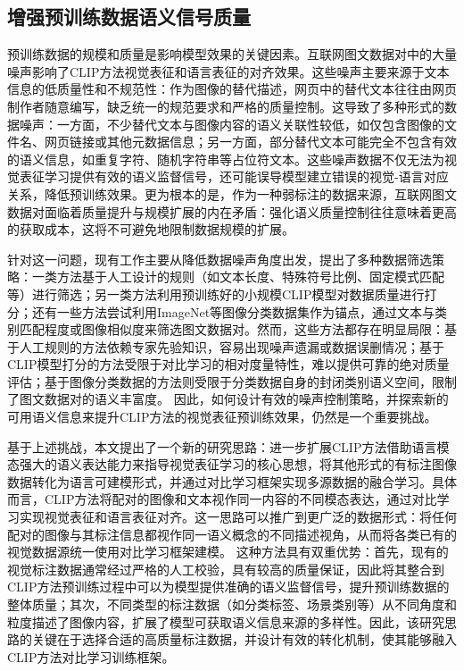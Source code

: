 \subsection{增强预训练数据语义信号质量}
预训练数据的规模和质量是影响模型效果的关键因素。互联网图文数据对中的大量噪声影响了CLIP方法视觉表征和语言表征的对齐效果。这些噪声主要来源于文本信息的低质量性和不规范性：作为图像的替代描述，网页中的替代文本往往由网页制作者随意编写，缺乏统一的规范要求和严格的质量控制。这导致了多种形式的数据噪声：一方面，不少替代文本与图像内容的语义关联性较低，如仅包含图像的文件名、网页链接或其他元数据信息；另一方面，部分替代文本可能完全不包含有效的语义信息，如重复字符、随机字符串等占位符文本。这些噪声数据不仅无法为视觉表征学习提供有效的语义监督信号，还可能误导模型建立错误的视觉-语言对应关系，降低预训练效果。更为根本的是，作为一种弱标注的数据来源，互联网图文数据对面临着质量提升与规模扩展的内在矛盾：强化语义质量控制往往意味着更高的获取成本，这将不可避免地限制数据规模的扩展。

针对这一问题，现有工作主要从降低数据噪声角度出发，提出了多种数据筛选策略：一类方法基于人工设计的规则（如文本长度、特殊符号比例、固定模式匹配等）进行筛选；另一类方法利用预训练好的小规模CLIP模型对数据质量进行打分；还有一些方法尝试利用ImageNet等图像分类数据集作为锚点，通过文本与类别匹配程度或图像相似度来筛选图文数据对。然而，这些方法都存在明显局限：基于人工规则的方法依赖专家先验知识，容易出现噪声遗漏或数据误删情况；基于CLIP模型打分的方法受限于对比学习的相对度量特性，难以提供可靠的绝对质量评估；基于图像分类数据的方法则受限于分类数据自身的封闭类别语义空间，限制了图文数据对的语义丰富度。
因此，如何设计有效的噪声控制策略，并探索新的可用语义信息来提升CLIP方法的视觉表征预训练效果，仍然是一个重要挑战。

基于上述挑战，本文提出了一个新的研究思路：进一步扩展CLIP方法借助语言模态强大的语义表达能力来指导视觉表征学习的核心思想，将其他形式的有标注图像数据转化为语言可建模形式，并通过对比学习框架实现多源数据的融合学习。具体而言，CLIP方法将配对的图像和文本视作同一内容的不同模态表达，通过对比学习实现视觉表征和语言表征对齐。这一思路可以推广到更广泛的数据形式：将任何配对的图像与其标注信息都视作同一语义概念的不同描述视角，从而将各类已有的视觉数据源统一使用对比学习框架建模。
这种方法具有双重优势：首先，现有的视觉标注数据通常经过严格的人工校验，具有较高的质量保证，因此将其整合到CLIP方法预训练过程中可以为模型提供准确的语义监督信号，提升预训练数据的整体质量；其次，不同类型的标注数据（如分类标签、场景类别等）从不同角度和粒度描述了图像内容，扩展了模型可获取语义信息来源的多样性。因此，该研究思路的关键在于选择合适的高质量标注数据，并设计有效的转化机制，使其能够融入CLIP方法对比学习训练框架。

